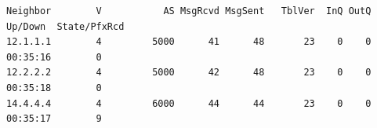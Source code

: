 \documentclass[11pt]{report}
\begin{document}
\begin{appendices}
\begin{lstlisting}
Neighbor        V           AS MsgRcvd MsgSent   TblVer  InQ OutQ Up/Down  State/PfxRcd
12.1.1.1        4         5000      41      48       23    0    0 00:35:16        0
12.2.2.2        4         5000      42      48       23    0    0 00:35:18        0
14.4.4.4        4         6000      44      44       23    0    0 00:35:17        9
\end{lstlisting}

\end{appendices}
\end{document}
